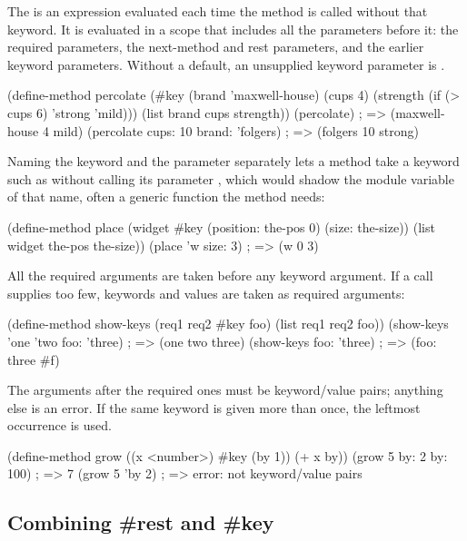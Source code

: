 \noindent The  is an expression evaluated each time the method
is called without that keyword. It is evaluated in a scope that includes all
the parameters before it: the required parameters, the next-method and
rest parameters, and the earlier keyword parameters. Without a default, an
unsupplied keyword parameter is .

\begin{dylan}
(define-method percolate (#key (brand 'maxwell-house)
                               (cups 4)
                               (strength (if (> cups 6) 'strong 'mild)))
  (list brand cups strength))
(percolate)                          ; => (maxwell-house 4 mild)
(percolate cups: 10 brand: 'folgers) ; => (folgers 10 strong)
\end{dylan}

\noindent Naming the keyword and the parameter separately lets a method take
a keyword such as  without calling its parameter
, which would shadow the module variable of that name, often
a generic function the method needs:

\begin{dylan}
(define-method place (widget #key (position: the-pos 0) (size: the-size))
  (list widget the-pos the-size))
(place 'w size: 3)                   ; => (w 0 3)
\end{dylan}

\noindent All the required arguments are taken before any keyword argument.
If a call supplies too few, keywords and values are taken as required
arguments:

\begin{dylan}
(define-method show-keys (req1 req2 #key foo)
  (list req1 req2 foo))
(show-keys 'one 'two foo: 'three)    ; => (one two three)
(show-keys foo: 'three)              ; => (foo: three #f)
\end{dylan}

\noindent The arguments after the required ones must be keyword/value pairs;
anything else is an error. If the same keyword is given more than once, the
leftmost occurrence is used.

\begin{dylan}
(define-method grow ((x <number>) #key (by 1)) (+ x by))
(grow 5 by: 2 by: 100)               ; => 7
(grow 5 'by 2)                       ; => error: not keyword/value pairs
\end{dylan}

\subsection{Combining \#rest and \#key}

